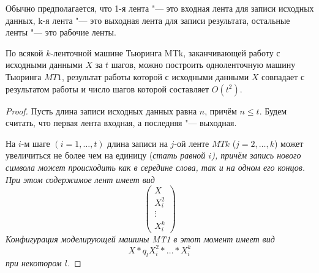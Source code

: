Обычно предполагается, что 1-я лента "--- это входная лента для записи исходных данных, k-я лента "--- это выходная лента для записи результата, остальные ленты "--- это рабочие ленты.

\begin{theorem}
	По всякой $ k $-ленточной машине Тьюринга MTk, заканчивающей работу с исходными данными $ X $ за $ t $ шагов, можно построить одноленточную машину Тьюринга $ MT1 $, результат работы которой с исходными данными $ X $ совпадает с результатом работы и число шагов которой составляет $ O(t^2) $.
\end{theorem}

\begin{proof}
	Пусть длина записи исходных данных равна $ n $, причём $ n \le t $.
	Будем считать, что первая лента входная, а последняя "--- выходная.

	На $ i $-м шаге $ (i = 1, \dots, t) $ длина записи на $ j $-ой ленте $ MTk $ ($ j = 2, \dots, k $) может увеличиться не более чем на единицу (\it стать равной $ i $), причём запись нового символа может происходить как в середине слова, так и на одном его концов.
	При этом содержимое лент имеет вид
	$$
	\begin{pmatrix}
		X \\
		X_i^2 \\
		\vdots \\
		X_i^k
	\end{pmatrix} $$
	Конфигурация моделирующей машины MT1 в этот момент имеет вид
	$$ X*q_lX_i^2* \dots *X_i^k $$
	при некотором $ l $.


\end{proof}
